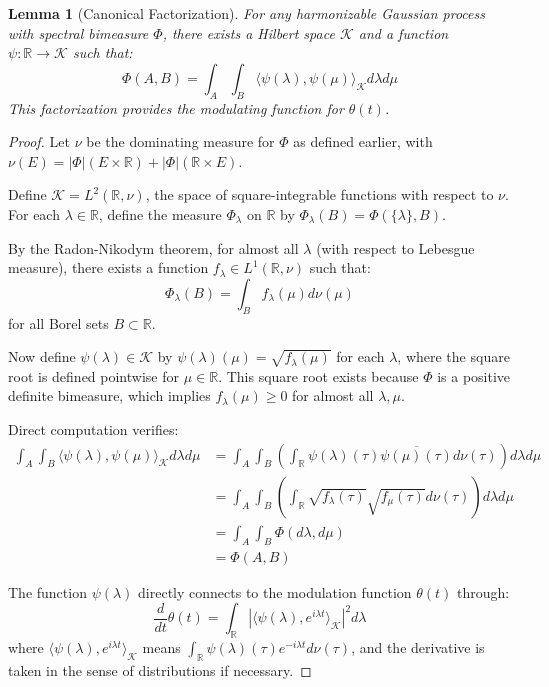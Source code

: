 \documentclass{article}
\theoremstyle{plain}
\newtheorem{lemma}[theorem]{Lemma}
\theoremstyle{definition}
\begin{document}
\begin{lemma}[Canonical Factorization]
For any harmonizable Gaussian process with spectral bimeasure $\Phi$, there exists a Hilbert space $\mathcal{K}$ and a function $\psi: \mathbb{R} \to \mathcal{K}$ such that:
\begin{equation}
\Phi(A,B) = \int_A \int_B \langle \psi(\lambda), \psi(\mu) \rangle_{\mathcal{K}} d\lambda d\mu
\end{equation}
This factorization provides the modulating function for $\theta(t)$.
\end{lemma}

\begin{proof}
Let $\nu$ be the dominating measure for $\Phi$ as defined earlier, with $\nu(E) = |\Phi|(E \times \mathbb{R}) + |\Phi|(\mathbb{R} \times E)$.

Define $\mathcal{K} = L^2(\mathbb{R}, \nu)$, the space of square-integrable functions with respect to $\nu$. For each $\lambda \in \mathbb{R}$, define the measure $\Phi_\lambda$ on $\mathbb{R}$ by $\Phi_\lambda(B) = \Phi(\{\lambda\}, B)$. 

By the Radon-Nikodym theorem, for almost all $\lambda$ (with respect to Lebesgue measure), there exists a function $f_\lambda \in L^1(\mathbb{R}, \nu)$ such that:
\begin{equation}
\Phi_\lambda(B) = \int_B f_\lambda(\mu) d\nu(\mu)
\end{equation}
for all Borel sets $B \subset \mathbb{R}$.

Now define $\psi(\lambda) \in \mathcal{K}$ by $\psi(\lambda)(\mu) = \sqrt{f_\lambda(\mu)}$ for each $\lambda$, where the square root is defined pointwise for $\mu \in \mathbb{R}$. This square root exists because $\Phi$ is a positive definite bimeasure, which implies $f_\lambda(\mu) \geq 0$ for almost all $\lambda, \mu$.

Direct computation verifies:
\begin{align}
\int_A \int_B \langle \psi(\lambda), \psi(\mu) \rangle_{\mathcal{K}} d\lambda d\mu &= \int_A \int_B \left(\int_\mathbb{R} \psi(\lambda)(\tau) \overline{\psi(\mu)(\tau)} d\nu(\tau)\right) d\lambda d\mu \\
&= \int_A \int_B \left(\int_\mathbb{R} \sqrt{f_\lambda(\tau)}\sqrt{f_\mu(\tau)} d\nu(\tau)\right) d\lambda d\mu \\
&= \int_A \int_B \Phi(d\lambda, d\mu) \\
&= \Phi(A, B)
\end{align}

The function $\psi(\lambda)$ directly connects to the modulation function $\theta(t)$ through:
\begin{equation}
\frac{d}{dt}\theta(t) = \int_{\mathbb{R}} |\langle \psi(\lambda), e^{i\lambda t} \rangle_{\mathcal{K}}|^2 d\lambda
\end{equation}
where $\langle \psi(\lambda), e^{i\lambda t} \rangle_{\mathcal{K}}$ means $\int_{\mathbb{R}} \psi(\lambda)(\tau) e^{-i\lambda t} d\nu(\tau)$, and the derivative is taken in the sense of distributions if necessary.
\end{proof}
\end{document}
